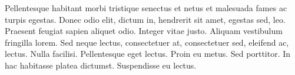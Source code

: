 \documentclass[AMA,STIX2COL,Linenumberson]{MRM}
\begin{document}
Pellentesque habitant morbi tristique senectus et netus et malesuada fames ac turpis egestas. Donec odio elit,
dictum in, hendrerit sit amet, egestas sed, leo. Praesent feugiat sapien aliquet odio. Integer vitae justo. Aliquam
vestibulum fringilla lorem. Sed neque lectus, consectetuer at, consectetuer sed, eleifend ac, lectus. Nulla facilisi.
Pellentesque eget lectus. Proin eu metus. Sed porttitor. In hac habitasse platea dictumst. Suspendisse eu lectus. 
\nocite{*}%
\end{document}

